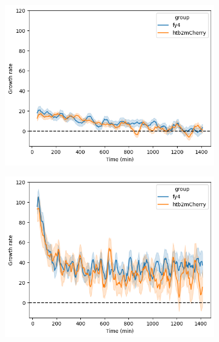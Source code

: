 \begin{figure}
  \centering
  \begin{subfigure}[htpb]{0.45\textwidth}
   \centering
   \includegraphics[width=\textwidth]{allstrains_31492_gr}
   \caption{
   }
   \label{fig:biology-lowglc-gr}
  \end{subfigure}%
  \begin{subfigure}[htpb]{0.45\textwidth}
   \centering
   \includegraphics[width=\textwidth]{allstrains_26643_gr}
   \caption{
   }
   \label{fig:biology-highglc-gr}
  \end{subfigure}


\end{figure}
